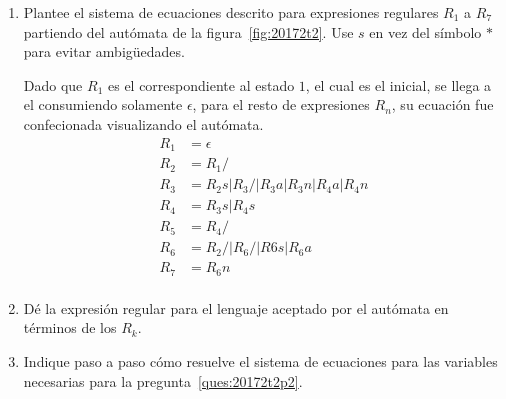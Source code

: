 \documentclass[spanish, fleqn]{article}
\begin{document}
  \begin{enumerate}
  \item %
    Plantee el sistema de ecuaciones descrito
    para expresiones regulares \(R_1\) a \(R_7\)
    partiendo del autómata de la figura~\ref{fig:20172t2}.
    Use \(s\) en vez del símbolo \(*\) para evitar ambigüedades.
    
    Dado que $R_{1}$ es el correspondiente al estado $1$, el cual es el inicial, se llega a el consumiendo solamente $\epsilon$, para el resto de expresiones $R_{n}$, su ecuación fue confecionada visualizando el autómata. 
    \begin{align*}
    R_{1}&=\epsilon \\
    R_{2}&=R_{1}/\\
    R_{3}&=R_{2}s|R_{3}/|R_{3}a|R_{3}n|R_{4}a|R_{4}n\\
    R_{4}&=R_{3}s|R_{4}s\\
    R_{5}&=R_{4}/\\
    R_{6}&=R_{2}/|R_{6}/|R{6}s|R_{6}a\\
    R_{7}&=R_{6}n\\
    \end{align*}
    
    
  \item %
    \label{ques:20172t2p2}
    Dé la expresión regular para el lenguaje aceptado por el autómata
    en términos de los \(R_k\).
    
  \item %
    Indique paso a paso cómo resuelve el sistema de ecuaciones
    para las variables necesarias para la pregunta~\ref{ques:20172t2p2}.
    

\end{enumerate}
\end{document}

